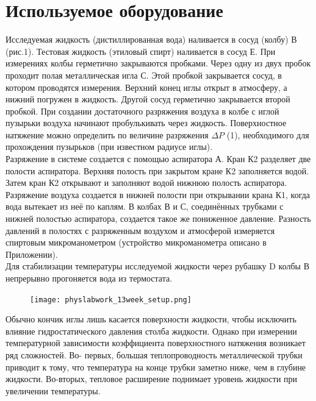 \documentclass[a4paper,12pt]{article} %
\begin{document}
\section{Используемое оборудование}

Исследуемая жидкость (дистиллированная вода)
наливается в сосуд (колбу) В (рис.1). Тестовая жидкость (этиловый спирт) наливается в
сосуд Е. При измерениях колбы герметично закрываются пробками. Через одну из двух
пробок проходит полая металлическая игла С. Этой пробкой закрывается сосуд, в
котором проводятся измерения. Верхний конец иглы открыт в атмосферу, а нижний
погружен в жидкость. Другой сосуд герметично закрывается второй пробкой. При
создании достаточного разряжения воздуха в колбе с иглой пузырьки воздуха начинают
пробулькивать через жидкость. Поверхностное натяжение можно определить по величине
разряжения $ \Delta P $ (1), необходимого для прохождения пузырьков (при известном радиусе
иглы). \\
Разряжение в системе создается с помощью аспиратора А. Кран К2 разделяет две полости
аспиратора. Верхняя полость при закрытом кране К2 заполняется водой. Затем кран К2
открывают и заполняют водой нижнюю полость аспиратора. Разряжение воздуха
создается в нижней полости при открывании крана К1, когда вода вытекает из неё по
каплям. В колбах В и С, соединённых трубками с нижней полостью аспиратора, создается
такое же пониженное давление. Разность давлений в полостях с разряженным воздухом и
атмосферой измеряется спиртовым микроманометром (устройство микроманометра
описано в Приложении). \\
Для стабилизации температуры исследуемой жидкости через рубашку D колбы В
непрерывно прогоняется вода из термостата. \\

\begin{figure}[h!]
\begin{floatrow}
         {\texttt{[image: physlabwork\_13week\_setup.png]}}     
\end{floatrow}
\end{figure}

Обычно кончик иглы лишь касается поверхности жидкости, чтобы исключить влияние
гидростатического давления столба жидкости. Однако при измерении температурной
зависимости коэффициента поверхностного натяжения возникает ряд сложностей. Во-
первых, большая теплопроводность металлической трубки приводит к тому, что
температура на конце трубки заметно ниже, чем в глубине жидкости. Во-вторых, тепловое
расширение поднимает уровень жидкости при увеличении температуры. \\
\end{document}
